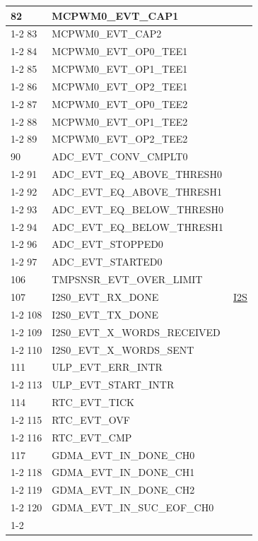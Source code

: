 \documentclass[main\_\_CN.tex]{subfiles}
\begin{document}
\begin{longtable}{ | l | l | l | }
82  & MCPWM0\_EVT\_CAP1   & \\ \cline{1-2}
83  & MCPWM0\_EVT\_CAP2   & \\ \cline{1-2}
84  & MCPWM0\_EVT\_OP0\_TEE1   & \\ \cline{1-2}
85  & MCPWM0\_EVT\_OP1\_TEE1   & \\ \cline{1-2}
86  & MCPWM0\_EVT\_OP2\_TEE1   & \\ \cline{1-2}
87  & MCPWM0\_EVT\_OP0\_TEE2   & \\ \cline{1-2}
88  & MCPWM0\_EVT\_OP1\_TEE2   & \\ \cline{1-2}
89  & MCPWM0\_EVT\_OP2\_TEE2   & \\ \hline
90  & ADC\_EVT\_CONV\_CMPLT0    & \nameref{mod:adc}   \\ \cline{1-2}
91  & ADC\_EVT\_EQ\_ABOVE\_THRESH0     & \\ \cline{1-2}
92  & ADC\_EVT\_EQ\_ABOVE\_THRESH1     & \\ \cline{1-2}
93  & ADC\_EVT\_EQ\_BELOW\_THRESH0     & \\ \cline{1-2}
94  & ADC\_EVT\_EQ\_BELOW\_THRESH1     & \\ \cline{1-2}
96  & ADC\_EVT\_STOPPED0 & \\ \cline{1-2}
97  & ADC\_EVT\_STARTED0 & \\ \hline
106 & TMPSNSR\_EVT\_OVER\_LIMIT & \nameref{mod:tmpsen}  \\ \hline
107 & I2S0\_EVT\_RX\_DONE & \hyperref[mod:i2s]{I2S}   \\ \cline{1-2}
108 & I2S0\_EVT\_TX\_DONE & \\ \cline{1-2}
109 & I2S0\_EVT\_X\_WORDS\_RECEIVED     & \\ \cline{1-2}
110 & I2S0\_EVT\_X\_WORDS\_SENT  & \\ \hline
111 & ULP\_EVT\_ERR\_INTR  & \nameref{mod:ulp}   \\ \cline{1-2}
113 & ULP\_EVT\_START\_INTR& \\ \hline
114 & RTC\_EVT\_TICK     & \nameref{mod:rtctimer}   \\ \cline{1-2}
115 & RTC\_EVT\_OVF      & \\ \cline{1-2}
116 & RTC\_EVT\_CMP      & \\ \hline
117 & GDMA\_EVT\_IN\_DONE\_CH0  &  \nameref{mod:dma} \\ \cline{1-2}
118 & GDMA\_EVT\_IN\_DONE\_CH1  & \\ \cline{1-2}
119 & GDMA\_EVT\_IN\_DONE\_CH2  & \\ \cline{1-2}
120 & GDMA\_EVT\_IN\_SUC\_EOF\_CH0     & \\ \cline{1-2}

\end{longtable}
\end{document}
